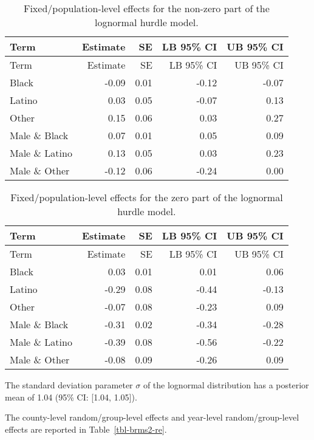 \documentclass[
  letterpaper,
  DIV=11,
  numbers=noendperiod]{scrartcl}
\begin{document}
\hypertarget{tbl-brms-hurdle-model-summary-2-racesex}{}
\begin{longtable}[]{@{}lrrrr@{}}
\caption{\label{tbl-brms-hurdle-model-summary-2-racesex}Fixed/population-level
effects for the non-zero part of the lognormal hurdle
model.}\tabularnewline
\toprule\noalign{}
Term & Estimate & SE & LB 95\% CI & UB 95\% CI \\
\midrule\noalign{}
\endfirsthead
\toprule\noalign{}
Term & Estimate & SE & LB 95\% CI & UB 95\% CI \\
\midrule\noalign{}
\endhead
\bottomrule\noalign{}
\endlastfoot
Black & -0.09 & 0.01 & -0.12 & -0.07 \\
Latino & 0.03 & 0.05 & -0.07 & 0.13 \\
Other & 0.15 & 0.06 & 0.03 & 0.27 \\
Male \& Black & 0.07 & 0.01 & 0.05 & 0.09 \\
Male \& Latino & 0.13 & 0.05 & 0.03 & 0.23 \\
Male \& Other & -0.12 & 0.06 & -0.24 & 0.00 \\
\end{longtable}

\hypertarget{tbl-brms-hurdle-model-summary-2-zero-racesex}{}
\begin{longtable}[]{@{}lrrrr@{}}
\caption{\label{tbl-brms-hurdle-model-summary-2-zero-racesex}Fixed/population-level
effects for the zero part of the lognormal hurdle model.}\tabularnewline
\toprule\noalign{}
Term & Estimate & SE & LB 95\% CI & UB 95\% CI \\
\midrule\noalign{}
\endfirsthead
\toprule\noalign{}
Term & Estimate & SE & LB 95\% CI & UB 95\% CI \\
\midrule\noalign{}
\endhead
\bottomrule\noalign{}
\endlastfoot
Black & 0.03 & 0.01 & 0.01 & 0.06 \\
Latino & -0.29 & 0.08 & -0.44 & -0.13 \\
Other & -0.07 & 0.08 & -0.23 & 0.09 \\
Male \& Black & -0.31 & 0.02 & -0.34 & -0.28 \\
Male \& Latino & -0.39 & 0.08 & -0.56 & -0.22 \\
Male \& Other & -0.08 & 0.09 & -0.26 & 0.09 \\
\end{longtable}

The standard deviation parameter \(\sigma\) of the lognormal
distribution has a posterior mean of 1.04 (95\% CI: {[}1.04, 1.05{]}).

The county-level random/group-level effects and year-level
random/group-level effects are reported in Table~\ref{tbl-brms2-re}.
\end{document}
